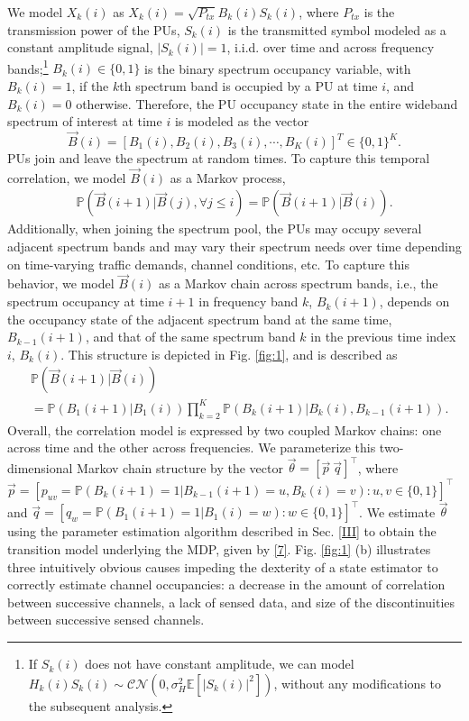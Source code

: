 \documentclass[10pt,twocolumn]{IEEEtran}
\begin{document}
We model $X_k(i)$ as $X_k(i){=}\sqrt{P_{tx}}B_k(i)S_k(i)$, where $P_{tx}$ is the transmission power of the PUs, $S_k(i)$ is the transmitted symbol modeled as a constant amplitude signal, $|S_k(i)|{=}1$, i.i.d. over time and across frequency bands;\footnote{If $S_k(i)$ does not have constant amplitude, we can model $H_{k}(i)S_{k}(i){\sim}\mathcal{CN}(0,\sigma_H^2\mathbb{E}[|S_{k}(i)|^2])$, without any modifications to the subsequent analysis.} $B_k(i){\in}\{0,1\}$ is the binary spectrum occupancy variable, with $B_k(i){=}1$, if the $k$th spectrum band is occupied by a PU at time $i$, and $B_k(i){=}0$ otherwise. Therefore, the PU occupancy state in the entire wideband spectrum of interest at time $i$ is modeled as the vector 
\begin{equation}\label{5}
    \vec{B}(i) = [B_1(i), B_2(i), B_3(i), \cdots, B_K(i)]^T {\in} \{0, 1\}^K.
\end{equation}
PUs join and leave the spectrum at random times. To capture this temporal correlation, we model $\vec{B}(i)$ as a Markov process,
\begin{equation}\label{6}
    \begin{aligned}
        \mathbb{P}(\vec{B}(i+1)|\vec{B}(j), \forall j \leq i) = \mathbb{P}(\vec{B}(i+1)|\vec{B}(i)).
    \end{aligned}
\end{equation}
Additionally, when joining the spectrum pool, the PUs may occupy several adjacent spectrum bands and may vary their spectrum needs over time depending on time-varying traffic demands, channel conditions, etc. To capture this behavior, we model $\vec{B}(i)$ as a Markov chain across spectrum bands, i.e., the spectrum occupancy at time $i{+}1$ in frequency band $k$, $B_{k}(i{+}1)$, depends on the occupancy state of the adjacent spectrum band at the same time, $B_{k{-}1}(i{+}1)$, and that of the same spectrum band $k$ in the previous time index $i$, $B_{k}(i)$. This structure is depicted in Fig. \ref{fig:1}, and is described as
\begin{align}\label{7}
&         \mathbb{P}(\vec{B}(i+1)|\vec{B}(i))\\&=
\nonumber
         \mathbb{P}(B_{1}(i+1)|B_{1}(i))
         \prod_{k=2}^{K} \mathbb{P}(B_{k}(i+1)|B_{k}(i), B_{k-1}(i+1)).
\end{align}
Overall, the correlation model is expressed by two coupled Markov chains: one across time and the other across frequencies. We parameterize this two-dimensional Markov chain structure by the vector $\vec{\theta}{=}[\vec{p}\ \vec{q}]^\top$, where $\vec{p}{=}[p_{uv}{=}\mathbb{P}(B_{k}(i{+}1){=}1|B_{k{-}1}(i{+}1){=}u,B_{k}(i){=}v){:} u,v{\in}\{0,1\}]^{\top}$ and $\vec{q}=[q_{w}=\mathbb{P}(B_{1}(i+1)=1|B_{1}(i)=w):w \in \{0,1\}]^\top$. We estimate  $\vec{\theta}$ using the parameter estimation algorithm described in Sec. \ref{III} to obtain the transition model underlying the MDP, given by \eqref{7}. Fig. \ref{fig:1} (b) illustrates three intuitively obvious causes impeding the dexterity of a state estimator to correctly estimate channel occupancies: a decrease in the amount of correlation between successive channels, a lack of sensed data, and size of the discontinuities between successive sensed channels.
\end{document}

